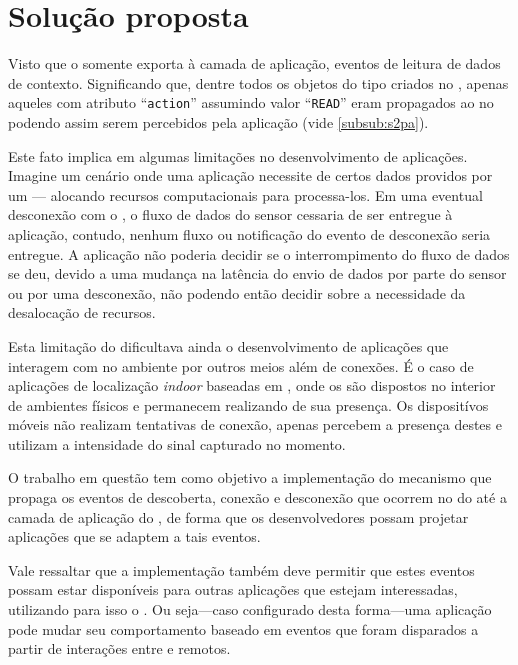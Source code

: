 \chapter{Solução proposta}\label{chap:solucao}

Visto que o \cddl somente exporta à camada de aplicação, eventos de leitura de dados de contexto.
Significando que, dentre todos os objetos do tipo \sensordata criados no \stwopa, apenas aqueles com atributo ``\texttt{action}'' assumindo valor ``\texttt{READ}'' eram propagados ao \qocevaluator no \cddl podendo assim serem percebidos pela aplicação (vide \autoref{subsub:s2pa}).

Este fato implica em algumas limitações no desenvolvimento de aplicações.
Imagine um cenário onde uma aplicação necessite de certos dados providos por um \smartobj--- alocando recursos computacionais para processa-los.
Em uma eventual desconexão com o \smartobj, o fluxo de dados do sensor cessaria de ser entregue à aplicação, contudo, nenhum fluxo ou notificação do evento de desconexão seria entregue.
A aplicação não poderia decidir se o interrompimento do fluxo de dados se deu, devido a uma mudança na latência do envio de dados por parte do sensor ou por uma desconexão, não podendo então decidir sobre a necessidade da desalocação de recursos.

Esta limitação do \cddl dificultava ainda o desenvolvimento de aplicações que interagem com \smartobjs no ambiente por outros meios além de conexões.
É o caso de aplicações de localização \textit{indoor} baseadas em \beacons \bluetooth, onde os \beacons são dispostos no interior de ambientes físicos e permanecem realizando \broadcast de sua presença.
Os dispositívos móveis não realizam tentativas de conexão, apenas percebem a presença destes \smartobjs e utilizam a intensidade do sinal capturado no momento.

O trabalho em questão tem como objetivo a implementação do mecanismo que propaga os eventos de descoberta, conexão e desconexão que ocorrem no \stwopa do \mhub até a camada de aplicação do \cddl, de forma que os desenvolvedores possam projetar aplicações que se adaptem a tais eventos.

Vale ressaltar que a implementação também deve permitir que estes eventos possam estar disponíveis para outras aplicações que estejam interessadas, utilizando para isso o \mqtt.
Ou seja---caso configurado desta forma---uma aplicação \mhubcddl pode mudar seu comportamento baseado em eventos que foram disparados a partir de interações entre \smartobjs e \smartphones remotos.

